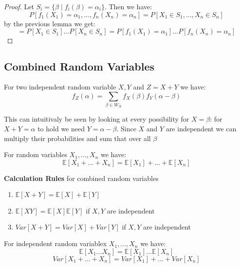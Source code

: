 \begin{proof}
    Let $S_i = \{\beta \mid f_i(\beta) = \alpha_i\}$. Then we have:
    $$P[f_1(X_1) = \alpha_1, \dots, f_n(X_n) = \alpha_n] = P[X_1 \in S_1, \dots, X_n \in S_n]$$
    by the previous lemma we get:
    $$= P[X_1 \in S_1] \dots P[X_n \in S_n] = P[f_1(X_1) = \alpha_1] \dots P[f_n(X_n) = \alpha_n]$$
\end{proof}
    
\subsection{Combined Random Variables}

\begin{theorem}
    For two independent random variable $X, Y$ and $Z = X+Y$ we have:
    $$f_Z(\alpha) = \sum_{\beta \in W_X} f_X(\beta) f_Y(\alpha-\beta)$$
\end{theorem}

\begin{remark}
    This can intuitivaly be seen by looking at every possibility for $X = \beta$: for $X+Y = \alpha$ to hold we need $Y = \alpha - \beta$. Since $X$ and $Y$ are independent we can multiply their probabilities and sum that over all $\beta$
\end{remark}

\begin{theorem}
    For random variables $X_1, \dots , X_n$ we have:
    $$\mathbb{E}[X_1 + \dots + X_n] = \mathbb{E}[X_1] + \dots + \mathbb{E}[X_n]$$
\end{theorem}

\begin{remark}
    \textbf{Calculation Rules} for combined random variables
    \begin{enumerate}
        \item $\mathbb{E}[X+Y] = \mathbb{E}[X] + \mathbb{E}[Y]$
        \item $\mathbb{E}[XY] = \mathbb{E}[X] \mathbb{E}[Y]$ if $X, Y$ are independent
        \item $Var[X+Y] = Var[X] + Var[Y]$ if $X, Y$ are independent
    \end{enumerate}
\end{remark}

\begin{theorem}
    For independent random variablex $X_1, \dots , X_n$ we have:
    $$\mathbb{E}[X_1 \dots X_n] = \mathbb{E}[X_1] \dots \mathbb{E}[X_n]$$
    $$Var[X_1 + \dots + X_n] = Var[X_1] + \dots + Var[X_n]$$
\end{theorem}

